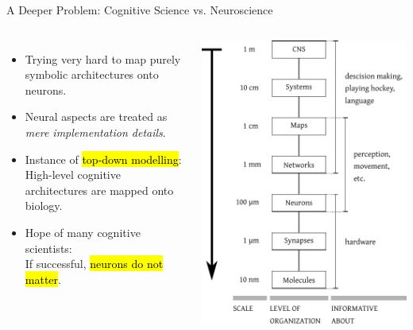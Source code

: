 \documentclass[handout,aspectratio=169]{beamer}
\begin{document}
	\begin{frame}{A Deeper Problem: Cognitive Science vs. Neuroscience}
		\begin{columns}
		\begin{itemize}
			\setlength{\itemsep}{0.75cm}
			\item Trying very hard to map purely symbolic architectures onto neurons.
			\item Neural aspects are treated as\\\emph{mere implementation details}.
			\item Instance of \hl{top-down modelling}:\\High-level cognitive architectures are mapped onto biology.
			\item Hope of many cognitive scientists:\\If successful, \hl{neurons do not matter}.
		\end{itemize}
		\includegraphics[width=\textwidth]{media/levels_direction_top_down.pdf}
		\end{columns}
	\end{frame}
\end{document}
